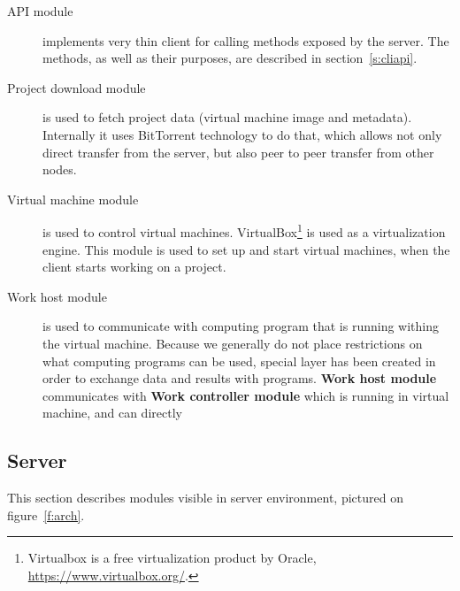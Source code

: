 \begin{description}

\item[API module] implements very thin client for calling methods exposed by the server. The methods, as well as their purposes, are described in section~\ref{s:cliapi}.

\item[Project download module] is used to fetch project data (virtual machine image and metadata). Internally it uses BitTorrent technology to do that, which allows not only direct transfer from the server, but also peer to peer transfer from other nodes.

\item[Virtual machine module] is used to control virtual machines. VirtualBox\footnote{Virtualbox is a free virtualization product by Oracle, \url{https://www.virtualbox.org/}.} is used as a virtualization engine. This module is used to set up and start virtual machines, when the client starts working on a project.

\item[Work host module] is used to communicate with computing program that is running withing the virtual machine. Because we generally do not place restrictions on what computing programs can be used, special layer has been created in order to exchange data and results with programs. \textbf{Work host module} communicates with \textbf{Work controller module} which is running in virtual machine, and can directly 

\end{description}

\subsection{Server}

This section describes modules visible in server environment, pictured on figure~\ref{f:arch}.

